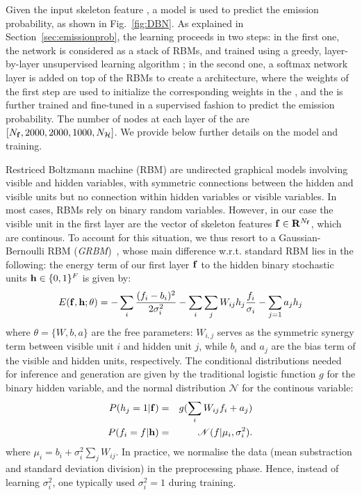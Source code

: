 Given the input skeleton feature \skfeature, a \DBN model is used to predict the emission probability, as shown in Fig.~\ref{fig:DBN}.
As explained in Section~\ref{sec:emissionprob}, the learning proceeds in two steps:
in the first one, the network is considered as a stack of RBMs, and trained using a greedy, layer-by-layer
unsupervised learning algorithm \cite{hinton2006fast};
in the second one, a softmax network layer is added on top of the RBMs to create a \DBN architecture,
where the  weights of the first step are used to initialize the corresponding weights in the \DBN,
and the \DBN is further trained and fine-tuned in a supervised fashion to predict the emission probability.
%
The number of nodes at each layer of the \DBN are $[N_{\mathbf{f}},2000,2000,1000,N_{\mathcal{H}}]$.
We provide below further details on the model and training.

%
Restriced Boltzmann machine (RBM) are undirected graphical models involving visible and hidden variables,
with symmetric connections between the hidden and visible units but no connection within hidden variables
or visible variables.
%
In most cases, RBMs rely on binary random variables.
%
However, in our case the visible unit in the first layer are the vector of skeleton features $\mathbf{f} \in \mathbf{R}^{N_{\mathbf{f}}}$, which are continous.
To account for this situation, we thus resort to a Gaussian-Bernoulli RBM (\emph{GRBM})~\cite{salakhutdinov2009learning},
whose main difference w.r.t. standard RBM lies in the following:
the energy term of our first layer $\mathbf{f}$ to the hidden binary stochastic units $\mathbf{h} \in \{0,1\}^F$ is given by:
\begin{equation}
    E(\skfeature,\rbmh;\theta) =-\sum_{i} \frac{(\skfeatureel_i-b_i)^2}{2\sigma_i^2} -\sum_{i} \sum_{j} W_{ij}  \rbmhel_j \frac{\skfeatureel_i}{\sigma_i}- \sum_{j=1}a_j\rbmhel_j
\label{GRBMenergy}
\end{equation}
where $\theta=\{W,b,a\}$ are the free parameters: $W_{i,j}$ serves as the symmetric synergy term between visible unit $i$ and hidden unit $j$,
while $b_i$ and $a_j$ are the bias term of the visible and hidden units, respectively.
%
The conditional distributions needed for inference and generation are given by the traditional logistic function $g$ for the binary hidden variable, and the normal distribution $\mathscr{N}$  for the continous variable:
\begin{eqnarray}
    P(h_j=1 | \mathbf{f}) & = & g (\sum_i W_{ij} f_i+a_j) \\
    P(f_i=f|\mathbf{h}) & = & \mathscr{N}( f |\mu_i,\sigma_i^2).
\end{eqnarray}
where $\mu_i=b_i+\sigma_i^2 \sum_j W_{ij}$.
In practice, we normalise the data (mean substraction and standard deviation division) in the preprocessing phase.
Hence, instead of learning $\sigma_i^2$, one typically used  $\sigma_i^2=1$ during training.

